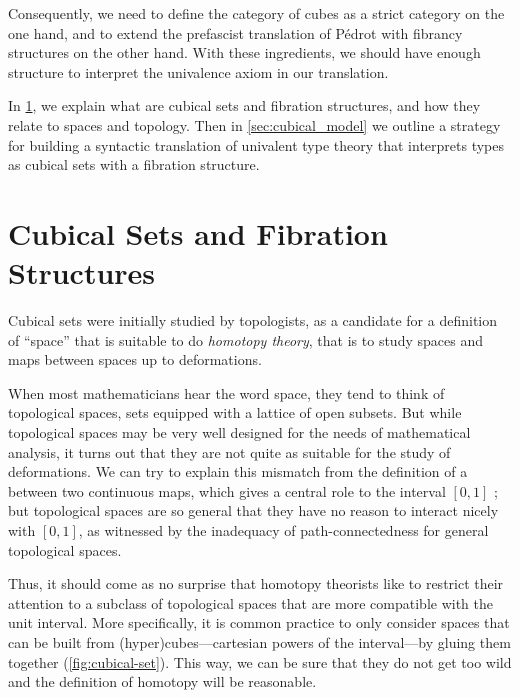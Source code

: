 Consequently, we need to define the category of cubes as a strict category on
the one hand, and to extend the prefascist translation of Pédrot with fibrancy 
structures on the other hand.
% 
With these ingredients, we should have enough structure to interpret the 
univalence axiom in our translation.

In \cref{sec:cubical_sets}, we explain what are cubical sets and fibration 
structures, and how they relate to spaces and topology. 
% 
Then in \cref{sec:cubical_model} we outline a strategy for building a syntactic 
translation of univalent type theory that interprets types as cubical sets with 
a fibration structure.

\section{Cubical Sets and Fibration Structures}
\label{sec:cubical_sets}

Cubical sets were initially studied by topologists, as a candidate for a 
definition of ``space'' that is suitable to do \emph{homotopy theory}, that is 
to study spaces and maps between spaces up to deformations.

When most mathematicians hear the word space, they tend to think of topological
spaces, \ie sets equipped with a lattice of open subsets. 
% 
But while topological spaces may be very well designed for the needs of 
mathematical analysis, it turns out that they are not quite as suitable for 
the study of deformations. 
% 
We can try to explain this mismatch from the definition of a 
 between two continuous maps, 
which gives a central role to the interval \( [0, 1] \) ; but topological 
spaces are so general that they have no reason to interact nicely with \( [0, 1] \),
as witnessed by the inadequacy of path-connectedness for general topological 
spaces.

Thus, it should come as no surprise that homotopy theorists like to restrict their 
attention to a subclass of topological spaces that are more compatible with
the unit interval. 
More specifically, it is common practice to only consider spaces that can be 
built from (hyper)cubes---cartesian powers of the interval---by gluing them together 
(\cref{fig:cubical-set}). This way, we can be sure that they do not 
get too wild and the definition of homotopy will be reasonable.

